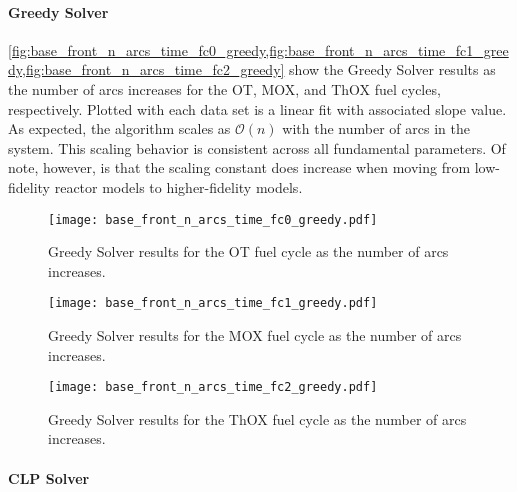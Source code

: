 \paragraph{Greedy Solver}

\cref{fig:base_front_n_arcs_time_fc0_greedy,fig:base_front_n_arcs_time_fc1_greedy,fig:base_front_n_arcs_time_fc2_greedy}
show the Greedy Solver results as the number of arcs increases for the OT, MOX,
and ThOX fuel cycles, respectively. Plotted with each data set is a linear fit
with associated slope value. As expected, the algorithm scales as
$\mathcal{O}(n)$ with the number of arcs in the system. This scaling behavior is
consistent across all fundamental parameters. Of note, however, is that the
scaling constant does increase when moving from low-fidelity reactor models to
higher-fidelity models.

\begin{figure}[h!]
  \begin{center}
    \texttt{[image: base\_front\_n\_arcs\_time\_fc0\_greedy.pdf]}
    \caption[]{
      \label{fig:base_front_n_arcs_time_fc0_greedy}
      Greedy Solver results for the OT fuel cycle as the number of arcs
      increases.  }
  \end{center}
\end{figure}

\begin{figure}[h!]
  \begin{center}
    \texttt{[image: base\_front\_n\_arcs\_time\_fc1\_greedy.pdf]}
    \caption[]{
      \label{fig:base_front_n_arcs_time_fc1_greedy}
      Greedy Solver results for the MOX fuel cycle as the number of arcs
      increases.
    }
  \end{center}
\end{figure}

\begin{figure}[h!]
  \begin{center}
    \texttt{[image: base\_front\_n\_arcs\_time\_fc2\_greedy.pdf]}
    \caption[]{
      \label{fig:base_front_n_arcs_time_fc2_greedy}
      Greedy Solver results for the ThOX fuel cycle as the number of arcs
      increases.
      }
  \end{center}
\end{figure}

\paragraph{CLP Solver}

